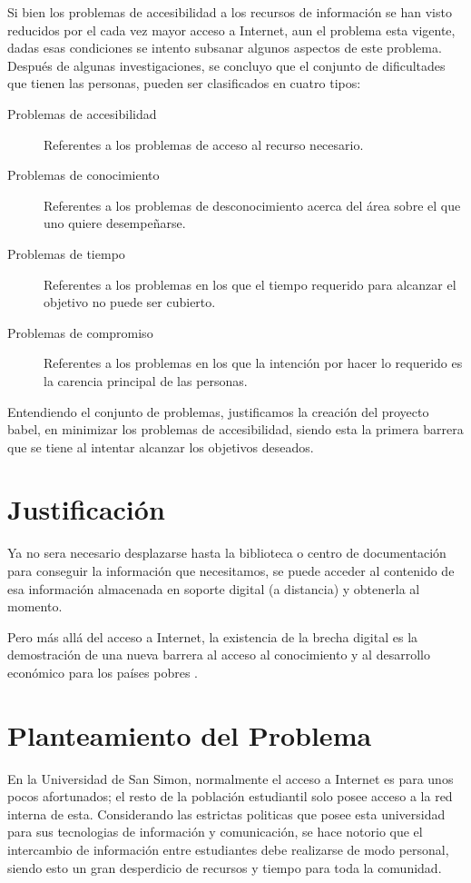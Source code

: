 \documentclass[letter,11pt,oneside,spanish]{article}
\begin{document}
Si bien los problemas de accesibilidad a los recursos de información se han visto reducidos por el
cada vez mayor acceso a Internet, aun el problema esta vigente, dadas esas condiciones se intento
subsanar algunos aspectos de este problema. Después de algunas investigaciones, se concluyo que el
conjunto de dificultades que tienen las personas, pueden ser clasificados en cuatro tipos:

\begin{description}
\item [Problemas de accesibilidad] Referentes a los problemas de acceso al recurso necesario.
\item [Problemas de conocimiento] Referentes a los problemas de desconocimiento acerca del área 
sobre el que uno quiere desempeñarse.
\item [Problemas de tiempo] Referentes a los problemas en los que el tiempo requerido para alcanzar
el objetivo no puede ser cubierto.
\item [Problemas de compromiso] Referentes a los problemas en los que la intención por hacer lo
requerido es la carencia principal de las personas.
\end{description}

Entendiendo el conjunto de problemas, justificamos la creación del proyecto babel, en minimizar los
problemas de accesibilidad, siendo esta la primera barrera que se tiene al intentar alcanzar los
objetivos deseados.

\section{Justificación}
Ya no sera necesario desplazarse hasta la biblioteca o centro de documentación para conseguir la
información que necesitamos, se puede acceder al contenido de esa información almacenada en soporte
digital (a distancia) y obtenerla al momento.

Pero más allá del acceso a Internet, la existencia de la brecha digital es la demostración de
una nueva barrera al acceso al conocimiento y al desarrollo económico para los países
pobres \cite{brecha}.

\section{Planteamiento del Problema}
En la Universidad de San Simon, normalmente el acceso a Internet es para unos pocos afortunados; el
resto de la población estudiantil solo posee acceso a la red interna de esta. Considerando las
estrictas politicas que posee esta universidad para sus tecnologias de información y comunicación, se
hace notorio que el intercambio de información entre estudiantes debe realizarse de modo personal, siendo esto un gran desperdicio de recursos y tiempo para toda la comunidad.
\end{document}
